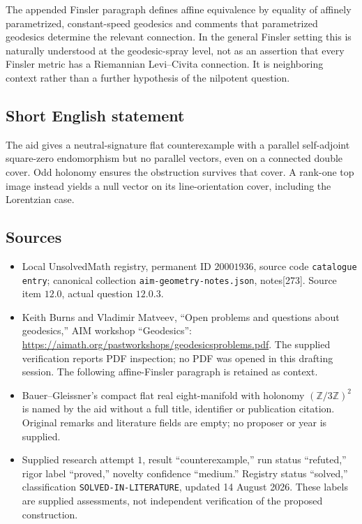 \documentclass[11pt]{article}
\newcommand{\Z}{\mathbb{Z}}
\begin{document}
The appended Finsler paragraph defines affine equivalence by equality of affinely parametrized, constant-speed geodesics and comments that parametrized geodesics determine the relevant connection. In the general Finsler setting this is naturally understood at the geodesic-spray level, not as an assertion that every Finsler metric has a Riemannian Levi--Civita connection. It is neighboring context rather than a further hypothesis of the nilpotent question.
\subsection{Short English statement}
The aid gives a neutral-signature flat counterexample with a parallel self-adjoint square-zero endomorphism but no parallel vectors, even on a connected double cover. Odd holonomy ensures the obstruction survives that cover. A rank-one top image instead yields a null vector on its line-orientation cover, including the Lorentzian case.
\subsection{Sources}
\begin{itemize}
\item Local UnsolvedMath registry, permanent ID \(20001936\), source code \texttt{catalogue entry}; canonical collection \texttt{aim-geometry-notes.json}, notes[273]. Source item \(12.0\), actual question \(12.0.3\).
\item Keith Burns and Vladimir Matveev, ``Open problems and questions about geodesics,'' AIM workshop ``Geodesics'': \url{https://aimath.org/pastworkshops/geodesicsproblems.pdf}. The supplied verification reports PDF inspection; no PDF was opened in this drafting session. The following affine-Finsler paragraph is retained as context.
\item Bauer--Gleissner's compact flat real eight-manifold with holonomy \((\Z/3\Z)^2\) is named by the aid without a full title, identifier or publication citation. Original remarks and literature fields are empty; no proposer or year is supplied.
\item Supplied research attempt \(1\), result ``counterexample,'' run status ``refuted,'' rigor label ``proved,'' novelty confidence ``medium.'' Registry status ``solved,'' classification \texttt{SOLVED-IN-LITERATURE}, updated 14 August 2026. These labels are supplied assessments, not independent verification of the proposed construction.
\end{itemize}
\end{document}
